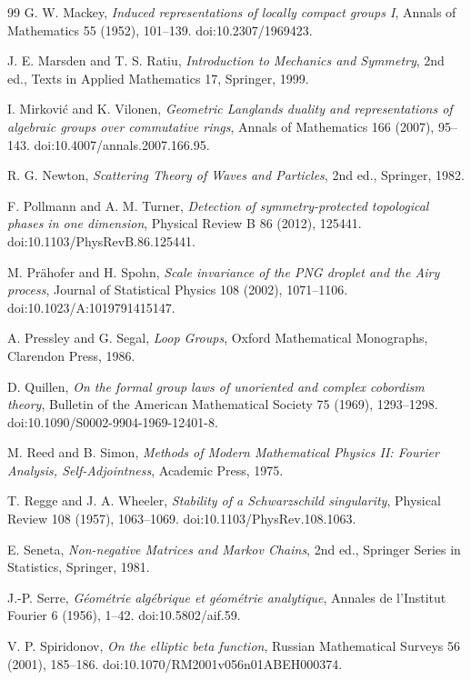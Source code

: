 \documentclass[11pt]{article}
\theoremstyle{definition}
\begin{document}
\begin{thebibliography}{99}
G. W. Mackey,
\emph{Induced representations of locally compact groups I},
Annals of Mathematics 55 (1952), 101--139.
doi:10.2307/1969423.

J. E. Marsden and T. S. Ratiu,
\emph{Introduction to Mechanics and Symmetry}, 2nd ed.,
Texts in Applied Mathematics 17, Springer, 1999.

I. Mirkovi\'c and K. Vilonen,
\emph{Geometric Langlands duality and representations of algebraic groups
over commutative rings},
Annals of Mathematics 166 (2007), 95--143.
doi:10.4007/annals.2007.166.95.

R. G. Newton,
\emph{Scattering Theory of Waves and Particles}, 2nd ed.,
Springer, 1982.

F. Pollmann and A. M. Turner,
\emph{Detection of symmetry-protected topological phases in one dimension},
Physical Review B 86 (2012), 125441.
doi:10.1103/PhysRevB.86.125441.

M. Pr\"ahofer and H. Spohn,
\emph{Scale invariance of the PNG droplet and the Airy process},
Journal of Statistical Physics 108 (2002), 1071--1106.
doi:10.1023/A:1019791415147.

A. Pressley and G. Segal,
\emph{Loop Groups},
Oxford Mathematical Monographs, Clarendon Press, 1986.

D. Quillen,
\emph{On the formal group laws of unoriented and complex cobordism theory},
Bulletin of the American Mathematical Society 75 (1969), 1293--1298.
doi:10.1090/S0002-9904-1969-12401-8.

M. Reed and B. Simon,
\emph{Methods of Modern Mathematical Physics II: Fourier Analysis,
Self-Adjointness},
Academic Press, 1975.

T. Regge and J. A. Wheeler,
\emph{Stability of a Schwarzschild singularity},
Physical Review 108 (1957), 1063--1069.
doi:10.1103/PhysRev.108.1063.

E. Seneta,
\emph{Non-negative Matrices and Markov Chains}, 2nd ed.,
Springer Series in Statistics, Springer, 1981.

J.-P. Serre,
\emph{G\'eom\'etrie alg\'ebrique et g\'eom\'etrie analytique},
Annales de l'Institut Fourier 6 (1956), 1--42.
doi:10.5802/aif.59.

V. P. Spiridonov,
\emph{On the elliptic beta function},
Russian Mathematical Surveys 56 (2001), 185--186.
doi:10.1070/RM2001v056n01ABEH000374.


\end{thebibliography}
\end{document}
